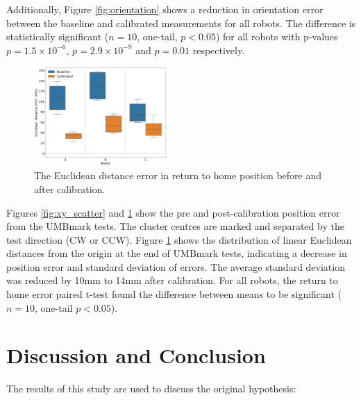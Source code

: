 \documentclass[conference]{IEEEtran}
\begin{document}
Additionally, Figure \ref{fig:orientation} shows a reduction in orientation error between the baseline and calibrated measurements for all robots. The difference is statistically significant ($n = 10$, one-tail, $p < 0.05$) for all robots with p-values $p=1.5\times10^{-6}$, $p=2.9\times10^{-9}$ and $p=0.01$ respectively. 

\begin{figure}[h!]
    \centering
    \includegraphics[width = 0.45\textwidth]{img/xy_error_boxplot.png}
    \caption{The Euclidean distance error in return to home position before and after calibration.}
    \label{fig:xy_box}
\end{figure}

Figures \ref{fig:xy_scatter} and \ref{fig:xy_box} show the pre and post-calibration position error from the UMBmark tests. 
The cluster centres are marked and separated by the test direction (CW or CCW).
Figure \ref{fig:xy_box} shows the distribution of linear Euclidean distances from the origin at the end of UMBmark tests, indicating a decrease in position error and standard deviation of errors. 
The average standard deviation was reduced by 10mm to 14mm after calibration.
For all robots, the return to home error paired t-test found the difference between means to be significant ($n = 10$, one-tail $p < 0.05$). 

\section{Discussion and Conclusion}\label{sec:discussion_conclusion}

The results of this study are used to discuss the original hypothesis:

\end{document}
